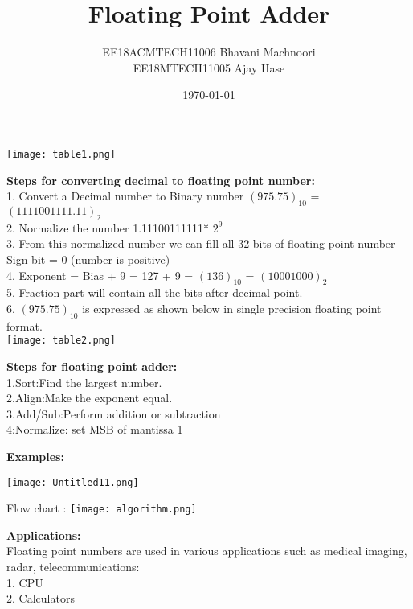 \documentclass{beamer}
\title{Floating Point Adder}
\author{EE18ACMTECH11006    Bhavani Machnoori   \\ 
EE18MTECH11005   Ajay Hase}
\date{\today}
\begin{document}
\begin{frame}
\titlepage
\end{frame}

\begin{frame}
\texttt{[image: table1.png]}

\textbf{Steps for converting decimal to floating point number:} \\

1. Convert a Decimal number to Binary number $(975.75)_{10}$ = $(1111001111.11)_2 $ \\
2. Normalize the number 1.11100111111* $2^9$\\
3. From this normalized number we can fill all 32-bits of floating point number
Sign bit = 0 (number is positive) \\
4. Exponent = Bias + 9 = 127 + 9 = $(136)_{10}$ = $(1000 1000)_2$ \\
5. Fraction part will contain all the bits after decimal point. \\
6. $(975.75)_{10}$ is expressed as shown below in single precision floating point format.\\
\texttt{[image: table2.png]}
\end{frame}
\begin{frame}
\textbf{Steps for floating point adder:}\\
1.Sort:Find the largest number.\\
2.Align:Make the exponent equal.\\
3.Add/Sub:Perform addition or subtraction\\
4:Normalize: set MSB of mantissa 1 
\end{frame}
\begin{frame}
\textbf{Examples:}

\texttt{[image: Untitled11.png]}
\end{frame}

\begin{frame}


Flow chart : 
\texttt{[image: algorithm.png]}

\end{frame}
\begin{frame}
\textbf{Applications:
}  \\

Floating point numbers are used in various applications such as medical
imaging, radar, telecommunications:\\
1. CPU \\
2. Calculators
\end{frame}
\end{document}
